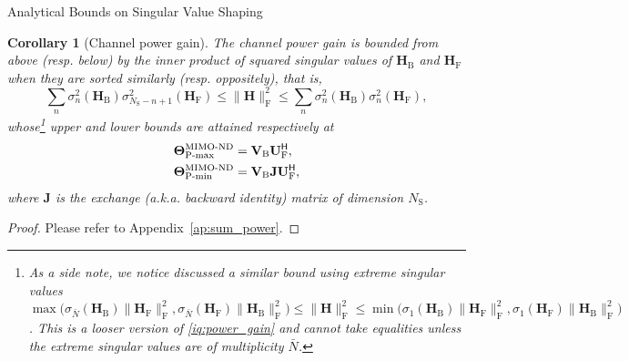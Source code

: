 \documentclass[journal]{IEEEtran}
\newtheorem{corollary}{Corollary}[proposition]
\begin{document}
\begin{section}{Analytical Bounds on Singular Value Shaping}
		\begin{corollary}[Channel power gain\label{co:sum_power}]
			The channel power gain is bounded from above (resp. below) by the inner product of squared singular values of $\mathbf{H}_\mathrm{B}$ and $\mathbf{H}_\mathrm{F}$ when they are sorted similarly (resp. oppositely), that is,
			\begin{equation}
				\sum_n \sigma_n^2(\mathbf{H}_\mathrm{B}) \sigma_{N_\mathrm{S}-n+1}^2(\mathbf{H}_\mathrm{F}) \le \lVert \mathbf{H} \rVert _\mathrm{F}^2 \le \sum_n \sigma_n^2(\mathbf{H}_\mathrm{B}) \sigma_n^2(\mathbf{H}_\mathrm{F}),
				\label{iq:power_gain}
			\end{equation}
			whose\footnote{As a side note, we notice \cite{Fang1994} discussed a similar bound using extreme singular values $\max\bigl(\sigma_{\bar{N}}(\mathbf{H}_\mathrm{B}) \lVert \mathbf{H}_\mathrm{F} \rVert _\mathrm{F}^2, \sigma_{\bar{N}}(\mathbf{H}_\mathrm{F}) \lVert \mathbf{H}_\mathrm{B} \rVert _\mathrm{F}^2\bigr) \le \lVert \mathbf{H} \rVert _\mathrm{F}^2 \le \min\bigl(\sigma_1(\mathbf{H}_\mathrm{B}) \lVert \mathbf{H}_\mathrm{F} \rVert _\mathrm{F}^2, \sigma_1(\mathbf{H}_\mathrm{F}) \lVert \mathbf{H}_\mathrm{B} \rVert _\mathrm{F}^2\bigr)$. This is a looser version of \eqref{iq:power_gain} and cannot take equalities unless the extreme singular values are of multiplicity $\bar{N}$.} upper and lower bounds are attained respectively at
			\begin{subequations}
				\begin{align}
					\mathbf{\Theta}_\textnormal{P-max}^\textnormal{MIMO-ND} & = \mathbf{V}_\mathrm{B} \mathbf{U}_\mathrm{F}^\mathsf{H}, \label{eq:power_max} \\
					\mathbf{\Theta}_\textnormal{P-min}^\textnormal{MIMO-ND} & = \mathbf{V}_\mathrm{B} \mathbf{J} \mathbf{U}_\mathrm{F}^\mathsf{H} \label{eq:power_min},
				\end{align}
			\end{subequations}
			where $\mathbf{J}$ is the exchange (a.k.a. backward identity) matrix of dimension $N_\mathrm{S}$.
		\end{corollary}
		\begin{proof}
			Please refer to Appendix~\ref{ap:sum_power}.
		\end{proof}


\end{section}
\end{document}

